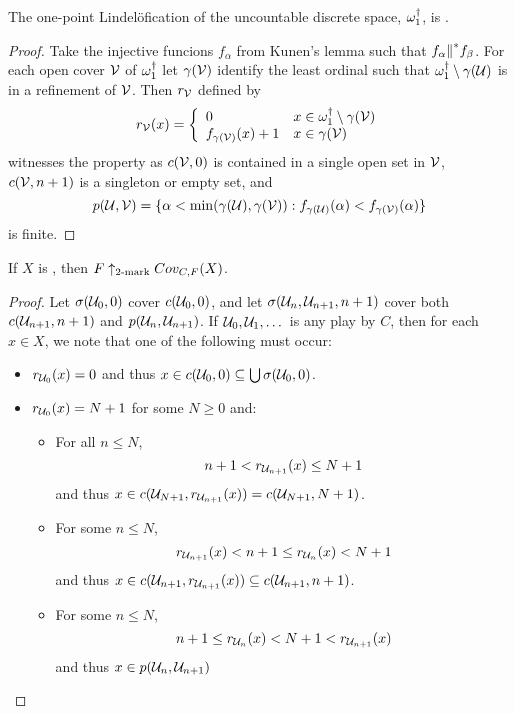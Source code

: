   \begin{theorem}
    The one-point Lindel\"ofication of the uncountable discrete space, $\omega_1^\dagger$, is \scish.
  \end{theorem}

  \begin{proof}
    Take the injective funcions $f_\alpha$ from Kunen's lemma such that $f_\alpha {\parallel}^* f_\beta$. For each open cover $\mathcal{V}$ of $\omega_1^\dagger$ let $\gamma(\mathcal{V})$ identify the least ordinal such that $\omega_1^\dagger\setminus\gamma(\mathcal{U})$ is in a refinement of $\mathcal{V}$. Then $r_{\mathcal{V}}$ defined by
      \[
        r_{\mathcal{V}}(x) = \left\{
      \begin{array}{ll}
        0 & x\in\omega_1^\dagger\setminus\gamma(\mathcal{V}) \\
        f_{\gamma(\mathcal{V})}(x)+1 & x\in\gamma(\mathcal{V})
      \end{array}
      \right.
      \] 
    witnesses the property as $c(\mathcal{V},0)$ is contained in a single open set in $\mathcal{V}$, $c(\mathcal{V},n+1)$ is a singleton or empty set, and
      \[
        p(\mathcal{U},\mathcal{V}) = \{\alpha<\min(\gamma(\mathcal{U}),\gamma(\mathcal{V})) : f_{\gamma(\mathcal{U})}(\alpha)<f_{\gamma(\mathcal{V})}(\alpha)\}
      \]
    is finite.
  \end{proof}

  \begin{theorem}
    If $X$ is \scish, then $F \uparrow_{2\text{-mark}}Cov_{C,F}(X)$.
  \end{theorem}

  \begin{proof}
    Let $\sigma(\mathcal{U}_0,0)$ cover $c(\mathcal{U}_0,0)$, and let $\sigma(\mathcal{U}_n,\mathcal{U}_{n+1},n+1)$ cover both $c(\mathcal{U}_{n+1},n+1)$ and $p(\mathcal{U}_n,\mathcal{U}_{n+1})$. If $\mathcal{U}_0,\mathcal{U}_1,\dots$ is any play by $C$, then for each $x\in X$, we note that one of the following must occur:
      \begin{itemize}
        \item $r_{\mathcal{U}_0}(x)=0$ and thus $x\in c(\mathcal{U}_0,0)\subseteq \bigcup \sigma(\mathcal{U}_0,0)$.
        \item $r_{\mathcal{U}_0}(x)=N+1$ for some $N\geq 0$ and:
        \begin{itemize}
          \item For all $n\leq N$, 
            \[
              n+1< r_{\mathcal{U}_{n+1}}(x)\leq N+1
            \] 
            and thus $x\in c(\mathcal{U}_{N+1},r_{\mathcal{U}_{n+1}}(x))=c(\mathcal{U}_{N+1},N+1)$.
          \item For some $n \leq N$,
            \[
              r_{\mathcal{U}_{n+1}}(x)< n+1 \leq r_{\mathcal{U}_n}(x)< N+1
            \]
            and thus $x\in c(\mathcal{U}_{n+1},r_{\mathcal{U}_{n+1}}(x))\subseteq c(\mathcal{U}_{n+1},n+1)$.
          \item For some $n \leq N$, 
            \[
              n+1 \leq r_{\mathcal{U}_n}(x)< N+1 < r_{\mathcal{U}_{n+1}}(x)
            \]
           and thus $x\in p(\mathcal{U}_n,\mathcal{U}_{n+1})$
         \end{itemize}
      \end{itemize}
  \end{proof}

